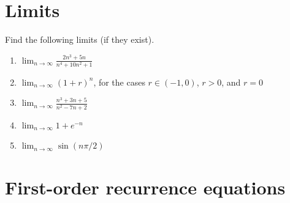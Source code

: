 \documentclass{article}
\begin{document}
\section{Limits}

Find the following limits (if they exist).

\begin{enumerate}[leftmargin = 0.5cm, label = (\alph*), rightmargin = 0.2cm]

    \item $\lim_{n\rightarrow\infty} \frac{2n^3 + 5n}{n^4 + 10n^2 + 1}$

    \item $\lim_{n\rightarrow\infty} (1+r)^n$, for the cases $r \in (-1, 0)$, $r > 0$, and $r = 0$

    \item $\lim_{n\rightarrow\infty} \frac{n^3 + 3n + 5}{n^2 - 7n + 2}$

    \item $\lim_{n \to \infty} 1 + e^{-n}$

    \item $\lim_{n \to \infty} \sin(n\pi/2)$

\end{enumerate}

\section{First-order recurrence equations}
\end{document}
